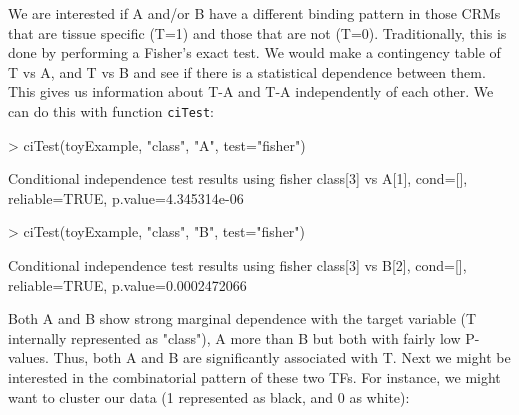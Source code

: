 \documentclass{article}
\newcommand{\Rfun}[1]{{\texttt{#1}}}
\begin{document}
We are interested if A and/or B have a different binding pattern in those CRMs that are tissue specific (T=1) and those that are not (T=0). Traditionally, this is done by performing a Fisher's exact test. We would make a contingency table of T vs A, and T vs B and see if there is a statistical dependence between them. This gives us information about T-A and T-A independently of each other. We can do this with function \Rfun{ciTest}:

\begin{Schunk}
\begin{Sinput}
> ciTest(toyExample, "class", "A", test="fisher")
\end{Sinput}
\begin{Soutput}
Conditional independence test results using fisher 
  class[3] vs A[1], cond=[], reliable=TRUE, p.value=4.345314e-06
\end{Soutput}
\begin{Sinput}
> ciTest(toyExample, "class", "B", test="fisher")
\end{Sinput}
\begin{Soutput}
Conditional independence test results using fisher 
  class[3] vs B[2], cond=[], reliable=TRUE, p.value=0.0002472066
\end{Soutput}
\end{Schunk}

Both A and B show strong marginal dependence with the target variable (T internally represented as "class"), A more than B but both with fairly low P-values. Thus, both A and B are significantly associated with T. Next we might be interested in the combinatorial pattern of these two TFs. For instance, we might want to cluster our data (1 represented as black, and 0 as white):
\end{document}

